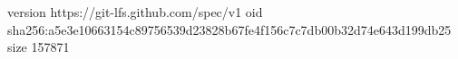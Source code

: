 version https://git-lfs.github.com/spec/v1
oid sha256:a5e3e10663154c89756539d23828b67fe4f156c7c7db00b32d74e643d199db25
size 157871
